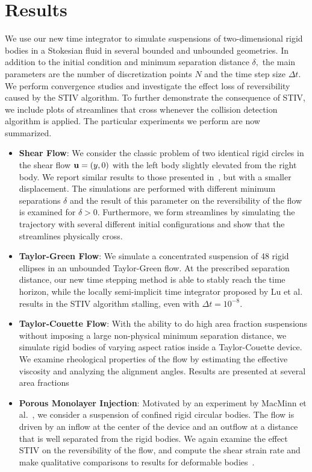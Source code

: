 \documentclass[preprint, 10pt]{elsarticle}
\begin{document}
\section{Results\label{s:results}} 
We use our new time integrator to simulate suspensions of two-dimensional
rigid bodies in a Stokesian fluid in several bounded and unbounded
geometries.  In addition to the initial condition and minimum separation
distance $\delta,$ the main parameters are the number of discretization
points $N$ and the time step size $\Delta t$. We perform convergence
studies and investigate the effect loss of reversibility caused by the
STIV algorithm.  To further demonstrate the consequence of STIV, we
include plots of streamlines that cross whenever the
collision detection algorithm is applied.  The particular experiments we
perform are now summarized.
\begin{itemize}
  \item {\bf Shear Flow}: We consider the classic problem of two
  identical rigid circles in the shear flow ${\mathbf{u}} = (y,0)$ with the left
  body slightly elevated from the right body.  We report similar results
  to those presented in~\cite{Lu2017}, but with a smaller
  displacement.  The simulations are performed with different minimum
  separations $\delta$ and the result of this
  parameter on the reversibility of the flow is examined for $\delta >
  0$.  Furthermore, we form streamlines by simulating the trajectory
  with several different initial configurations and show that the
  streamlines physically cross.

  \item {\bf Taylor-Green Flow}: We simulate a concentrated suspension of 48 rigid ellipses in an unbounded Taylor-Green
  flow. At the prescribed separation distance, our new time stepping
  method is able to stably reach the time horizon, while the locally
  semi-implicit time integrator proposed by Lu et al.~\cite{Lu2017}
  results in the STIV algorithm stalling, even with $\Delta t = 10^{-8}$.

  \item {\bf Taylor-Couette Flow}: With the ability to do high area fraction suspensions
 without imposing a large non-physical minimum separation
  distance, we simulate rigid bodies of varying aspect ratios inside a
  Taylor-Couette device.  We examine rheological properties of the flow
  by estimating the effective viscosity and analyzing the alignment
  angles.  Results are presented at several area fractions

  \item {\bf Porous Monolayer Injection}: Motivated by an experiment by
  MacMinn et al.~\cite{MacMinn2015}, we consider a suspension of
  confined rigid circular bodies.  The flow is driven by an inflow 
  at the center of the device and an outflow at a distance that is well
  separated from the rigid bodies.  We again examine the effect STIV on
  the reversibility of the flow, and compute the shear strain rate and
  make qualitative comparisons to results for deformable
  bodies~\cite{MacMinn2015}.
\end{itemize}
\end{document}

